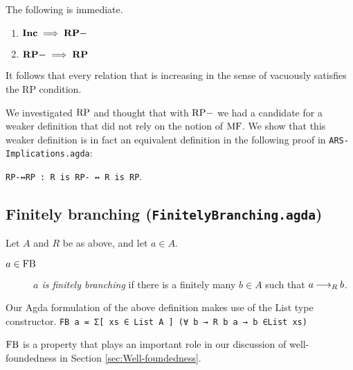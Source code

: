 The following is immediate.
\begin{proposition}\hfill 
    \begin{enumerate}
        \item $\mathbf{Inc} \implies \mathbf{RP-}$
        \item $\mathbf{RP-} \implies \mathbf{RP}$
    \end{enumerate}
\end{proposition}


It follows that every relation that is increasing in the sense of \terese
vacuously satisfies the RP condition.

We investigated $\mathrm{RP}$ and thought that with $\mathrm{RP-}$ we had a candidate for a weaker definition that 
did not rely on the notion of $\mathrm{MF}$. We show that this weaker definition is 
in fact an equivalent definition in the following proof in \texttt{ARS-Implications.agda}: 

\verb|RP-↔RP : R is RP- ↔ R is RP|. 

\subsection{Finitely branching (\texttt{FinitelyBranching.agda})}

\begin{definition} Let $A$ and $R$ be as above, and let $a \in A$.
    \begin{description}
        \item[$a \in \mathrm{FB}$] \emph{$a$ is finitely branching} if there is a finitely many $b \in A$ such that $a \mathbin{\longrightarrow_R} b$.  
    \end{description}
\end{definition}
Our Agda formulation of the above definition makes use of the List type constructor. 
\verb|FB a = Σ[ xs ∈ List A ] (∀ b → R b a → b ∈List xs)|

$\mathrm{FB}$ is a property that plays an important role in our discussion of well-foundedness in Section \ref{sec:Well-foundedness}.